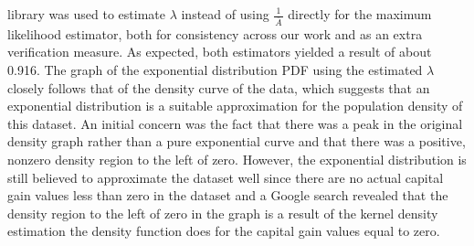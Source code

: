 \documentclass[12pt, letterpaper]{article}
\begin{document}
library was used to estimate $\lambda$ instead of using $\frac{\ 1\ }{\overline{A}}$ directly for the 
maximum likelihood estimator, both for consistency across our work and as an extra verification measure. 
As expected, both estimators yielded a result of about 0.916. The graph of the exponential distribution 
PDF using the estimated $\lambda$ closely follows that of the density curve of the data, which suggests 
that an exponential distribution is a suitable approximation for the population density of this dataset. 
An initial concern was the fact that there was a peak in the original density graph rather than a pure 
exponential curve and that there was a positive, nonzero density region to the left of zero. However, the 
exponential distribution is still believed to approximate the dataset well since there are no actual 
capital gain values less than zero in the dataset and a Google search revealed that the density region to 
the left of zero in the graph is a result of the kernel density estimation the density function does for 
the capital gain values equal to zero.


\newpage
\noindent
\end{document}
